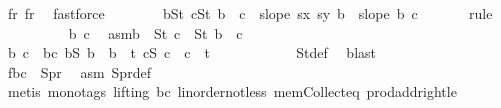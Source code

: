 \begin{isabellebody}
\ f{}r{}\ f{}r{}\ \isamarkupfalse%
\ fastforce\isanewline
\isanewline
\ \ \ \ \ \ \isamarkupfalse%
\ {\isachardoublequoteopen}{\isasymforall}b{\isasymin}S{}t{\isachardot}{\kern0pt}\ {\isasymforall}c{\isasymin}S{}t{\isachardot}{\kern0pt}\ b\ {\isacharless}{\kern0pt}\ c\ {\isasymlongrightarrow}\ slope\ {\isacharparenleft}{\kern0pt}s{}x{\isacharcomma}{\kern0pt}\ s{}y{\isacharparenright}{\kern0pt}\ b\ {\isachargreater}{\kern0pt}\ slope\ b\ c{\isachardoublequoteclose}\isanewline
\ \ \ \ \ \ \isamarkupfalse%
{\isacharparenleft}{\kern0pt}rule{\isacharplus}{\kern0pt}{\isacharparenright}{\kern0pt}\isanewline
\ \ \ \ \ \ \ \ \isamarkupfalse%
\ b\ c\ \isamarkupfalse%
\ asm{\isacharcolon}{\kern0pt}{\isachardoublequoteopen}b\ {\isasymin}\ S{}t{\isachardoublequoteclose}\ {\isachardoublequoteopen}c\ {\isasymin}\ S{}t{\isachardoublequoteclose}\ {\isachardoublequoteopen}b\ {\isacharless}{\kern0pt}\ c{\isachardoublequoteclose}\isanewline
\ \ \ \ \ \ \ \ \isamarkupfalse%
\ \isamarkupfalse%
\ b{}\ c{}\ \ b{}c{}{\isacharcolon}{\kern0pt}\ {\isachardoublequoteopen}b{}{\isasymin}S{}{\isachardoublequoteclose}\ {\isachardoublequoteopen}b\ {\isacharequal}{\kern0pt}\ b{}\ {\isacharplus}{\kern0pt}\ t{\isachardoublequoteclose}\ {\isachardoublequoteopen}c{}{\isasymin}S{}{\isachardoublequoteclose}\ {\isachardoublequoteopen}c\ {\isacharequal}{\kern0pt}\ c{}\ {\isacharplus}{\kern0pt}\ t{\isachardoublequoteclose}\isanewline
\ \ \ \ \ \ \ \ \ \ \isamarkupfalse%
\ S{}t{\isacharunderscore}{\kern0pt}def\ \isamarkupfalse%
\ blast\isanewline
\ \ \ \ \ \ \ \ \isamarkupfalse%
\ f{}{\isacharcolon}{\kern0pt}{\isachardoublequoteopen}{\isacharparenleft}{\kern0pt}b{}{\isacharcomma}{\kern0pt}c{}{\isacharparenright}{\kern0pt}\ {\isasymin}\ S{}pr{\isachardoublequoteclose}\ \isamarkupfalse%
\ asm\ S{}pr{\isacharunderscore}{\kern0pt}def\ \isamarkupfalse%
\ {\isacharparenleft}{\kern0pt}metis\ {\isacharparenleft}{\kern0pt}mono{\isacharunderscore}{\kern0pt}tags{\isacharcomma}{\kern0pt}\ lifting{\isacharparenright}{\kern0pt}\ b{}c{}{\isacharparenleft}{\kern0pt}{}{\isacharcomma}{\kern0pt}{}{\isacharcomma}{\kern0pt}{}{\isacharcomma}{\kern0pt}{}{\isacharparenright}{\kern0pt}\ linorder{\isacharunderscore}{\kern0pt}not{\isacharunderscore}{\kern0pt}less\ mem{\isacharunderscore}{\kern0pt}Collect{\isacharunderscore}{\kern0pt}eq\ prod{\isacharunderscore}{\kern0pt}addright{\isacharunderscore}{\kern0pt}le{\isacharparenright}{\kern0pt}\isanewline

\end{isabellebody}
